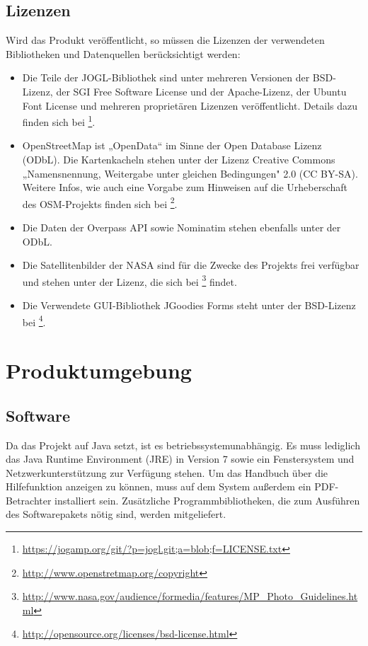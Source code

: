 \documentclass[10pt]{scrreprt}
\begin{document}
\pagebreak
\section{Lizenzen}
Wird das Produkt veröffentlicht, so müssen die Lizenzen der verwendeten Bibliotheken und Datenquellen berücksichtigt werden:
\begin{itemize}
\item Die Teile der JOGL-Bibliothek sind unter mehreren Versionen der BSD-Lizenz, der SGI Free Software License und der Apache-Lizenz, der Ubuntu Font License und mehreren proprietären Lizenzen veröffentlicht. Details dazu finden sich bei  \footnote{\url{https://jogamp.org/git/?p=jogl.git;a=blob;f=LICENSE.txt}}.
\item OpenStreetMap ist „OpenData“ im Sinne der Open Database Lizenz (ODbL). Die Kartenkacheln stehen unter der Lizenz  Creative Commons „Namensnennung, Weitergabe unter gleichen Bedingungen" 2.0 (CC BY-SA). Weitere Infos, wie auch eine Vorgabe zum Hinweisen auf die Urheberschaft des OSM-Projekts finden sich bei \footnote{\url{http://www.openstretmap.org/copyright}}.
\item Die Daten der Overpass API sowie Nominatim stehen ebenfalls unter der ODbL.
\item Die Satellitenbilder der NASA sind für die Zwecke des Projekts frei verfügbar und stehen unter der Lizenz, die sich bei \footnote{\url{http://www.nasa.gov/audience/formedia/features/MP_Photo_Guidelines.html}} findet.
\item Die Verwendete GUI-Bibliothek JGoodies Forms steht unter der BSD-Lizenz bei \footnote{\url{http://opensource.org/licenses/bsd-license.html}}.
\end{itemize}




\chapter{Produktumgebung}
\section{Software}
Da das Projekt auf Java setzt, ist es betriebssystemunabhängig. Es muss lediglich das Java Runtime Environment (JRE) in Version 7 sowie ein Fenstersystem und Netzwerkunterstützung zur Verfügung stehen. Um das Handbuch über die Hilfefunktion anzeigen zu können, muss auf dem System außerdem ein PDF-Betrachter installiert sein. Zusätzliche Programmbibliotheken, die zum Ausführen des Softwarepakets nötig sind, werden mitgeliefert.\\
\end{document}
